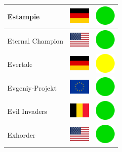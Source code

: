 \documentclass[12pt, a4paper, twoside]{report}
\begin{document}
\begin{center}
\begin{longtable}{|p{5cm}|p{2cm}|p{2cm}|}
 Estampie                                                   & \includegraphics[width=1cm]{../4x3/de} &   \includegraphics[width=1cm]{../likes/y} \\ \hline
 Eternal Champion                                           & \includegraphics[width=1cm]{../4x3/us} &   \includegraphics[width=1cm]{../likes/y} \\ \hline
 Evertale                                                   & \includegraphics[width=1cm]{../4x3/de} &   \includegraphics[width=1cm]{../likes/m} \\ \hline
 Evgeniy-Projekt                                            & \includegraphics[width=1cm]{../4x3/eu} &   \includegraphics[width=1cm]{../likes/y} \\ \hline
 Evil Invaders                                              & \includegraphics[width=1cm]{../4x3/be} &   \includegraphics[width=1cm]{../likes/y} \\ \hline
 Exhorder                                                   & \includegraphics[width=1cm]{../4x3/us} &   \includegraphics[width=1cm]{../likes/y} \\ \hline

\end{longtable}
\end{center}
\end{document}
